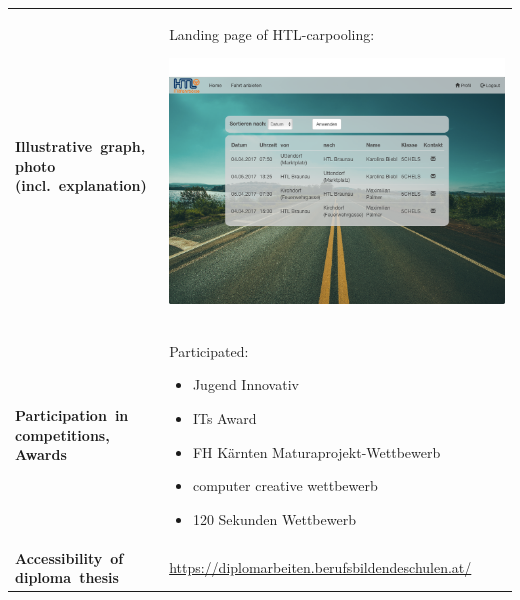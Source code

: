 \renewcommand{\arraystretch}{2}
\begin{tabularx}{1\textwidth}{ p{3.5cm} X }

\textbf{\mbox{Illustrative graph,} \mbox{photo} \mbox{(incl. explanation)}} & 
{
Landing page of HTL-carpooling:
\begin{center}
	\includegraphics[width=1\linewidth]{media/images/typ_screen}
\end{center}
} \\
  
\textbf{\mbox{Participation in} competitions, Awards} & 
{
Participated:
\begin{itemize}
\item Jugend Innovativ
\item ITs Award
\item FH Kärnten Maturaprojekt-Wettbewerb
\item computer creative wettbewerb
\item 120 Sekunden Wettbewerb
\end{itemize}
} \\

\textbf{\mbox{Accessibility of} \mbox{diploma thesis}} & 
{\url{https://diplomarbeiten.berufsbildendeschulen.at/}} \\



\end{tabularx}






